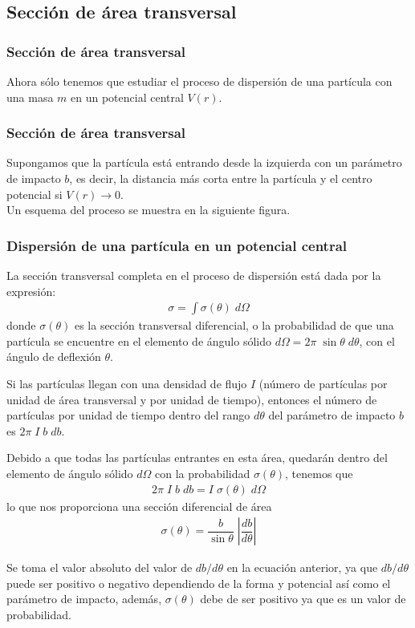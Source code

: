 \subsection{Sección de área transversal}
\begin{frame}
\frametitle{Sección de área transversal}
Ahora sólo tenemos que estudiar el proceso de dispersión de una partícula con una masa $m$ en un potencial central $V(r)$.
\end{frame}
\begin{frame}
\frametitle{Sección de área transversal}
Supongamos que la partícula está entrando desde la izquierda con un parámetro de impacto $b$, es decir, la distancia más corta entre la partícula y el centro potencial si $V(r) \rightarrow 0$. 
\\
\bigskip
Un esquema del proceso se muestra en la siguiente figura.
\end{frame}
\begin{frame}[fragile]
\frametitle{Dispersión de una partícula en un potencial central}
\begin{figure}
\centering

\end{figure}
\end{frame}
\begin{frame}
La sección transversal completa en el proceso de dispersión está dada por la expresión:
\begin{eqnarray}
\sigma = \int \sigma (\theta) \; d \Omega
\end{eqnarray}
donde $\sigma(\theta)$ es la sección transversal diferencial, o la probabilidad de que una partícula se encuentre en el elemento de ángulo sólido $d \Omega = 2 \pi \; \sin \theta \; d \theta$, con el ángulo de deflexión $\theta$.
\end{frame}
\begin{frame}
Si las partículas llegan con una densidad de flujo $I$ (número de partículas por unidad de área transversal y por unidad de tiempo), entonces el número de partículas por unidad de tiempo dentro del rango $d\theta$ del parámetro de impacto $b$ es $2 \pi \; I \; b \; db$.
\end{frame}
\begin{frame}
Debido a que todas las partículas entrantes en esta área, quedarán dentro del elemento de ángulo sólido $d \Omega$ con la probabilidad $\sigma(\theta)$, tenemos que
\begin{eqnarray}
2 \pi \; I \; b \; db = I \; \sigma(\theta) \; d \Omega
\end{eqnarray}
lo que nos proporciona una sección diferencial de área
\begin{eqnarray}
\sigma(\theta) = \dfrac{b}{\sin \theta} \; \left| \dfrac{db}{d \theta} \right|
\label{eq:sigma_theta}
\end{eqnarray}
\end{frame}
\begin{frame}
Se toma el valor absoluto del valor de $db/d\theta$ en la ecuación anterior, ya que $db / d\theta$ puede ser positivo o negativo dependiendo de la forma y potencial así como el parámetro de impacto, además, $\sigma(\theta)$ debe de ser positivo ya que es un valor de probabilidad.
\end{frame}
